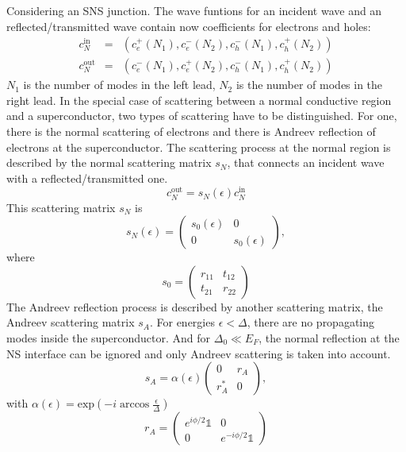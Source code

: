 Considering an SNS junction. The wave funtions for an incident wave and an reflected/transmitted wave contain now coefficients for electrons and holes:
\begin{eqnarray}
c_N^\text{in} &=& \left( c^+_e(N_1), c^-_e(N_2), c^-_h(N_1), c^+_h(N_2) \right) \\
c_N^\text{out} &=& \left( c^-_e(N_1), c^+_e(N_2), c^-_h(N_1), c^+_h(N_2) \right)
\end{eqnarray}
$N_1$ is the number of modes in the left lead, $N_2$ is the number of modes in the right lead. In the special case of scattering between a normal conductive region and a superconductor, two types of scattering have to be distinguished. For one, there is the normal scattering of electrons and there is Andreev reflection of electrons at the superconductor. The scattering process at the normal region is described by the normal scattering matrix $s_N$, that connects an incident wave with a reflected/transmitted one.
\begin{equation}
c^\text{out}_N = s_N(\epsilon) c^\text{in}_N
\end{equation}
This scattering matrix $s_N$ is
\begin{equation}
s_N (\epsilon) = \begin{pmatrix} s_0 (\epsilon ) & 0  \\ 0 & s_0 ( \epsilon) \end{pmatrix} \label{eq:s-n},
\end{equation}
where
\begin{equation}
s_0 = \begin{pmatrix} r_{1 1} & t_{1 2} \\ t_{2 1} & r_{2 2} \end{pmatrix}
\end{equation}
The Andreev reflection process is described by another scattering matrix, the Andreev scattering matrix $s_A$. For  energies $\epsilon < \Delta$, there are no propagating modes inside the superconductor.  And for $\Delta_0 \ll E_F$, the normal reflection at the NS interface can be ignored and only Andreev scattering is taken into account.
\begin{equation}
s_A = \alpha(\epsilon) \begin{pmatrix} 0 & r_A \\ r_A^* & 0 \end{pmatrix}, 
\end{equation}
with $\alpha ( \epsilon ) = \text{exp} \left( -i \arccos \frac{\epsilon}{\Delta} \right) $
\begin{equation}
r_A = \begin{pmatrix} e^{i \phi /2 } \mathds{1} & 0 \\ 0 & e^{-i \phi / 2 } \mathds{1} \end{pmatrix}
\end{equation}
